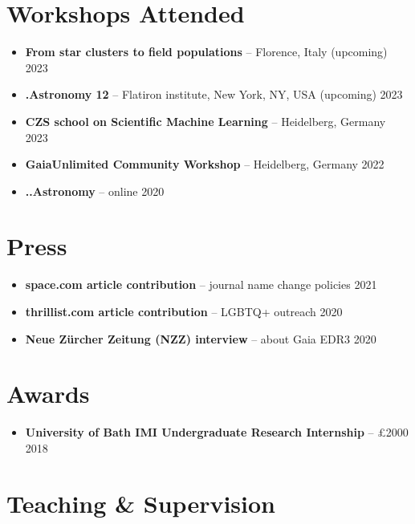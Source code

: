 \documentclass[12pt, letterpaper]{hunt-cv}
\begin{document}
\section*{Workshops Attended}

\begin{itemize}
    \item \textbf{From star clusters to field populations} -- Florence, Italy \hfill (upcoming) 2023
    \item \textbf{.Astronomy 12} -- Flatiron institute, New York, NY, USA \hfill (upcoming) 2023
    \item \textbf{CZS school on Scientific Machine Learning} -- Heidelberg, Germany \hfill 2023
    \item \textbf{GaiaUnlimited Community Workshop} -- Heidelberg, Germany \hfill 2022
    \item \textbf{..Astronomy} -- online \hfill 2020
\end{itemize}


\section*{Press}

\begin{itemize}
    \item \textbf{space.com article contribution} -- journal name change policies \hfill 2021
    \item \textbf{thrillist.com article contribution} -- LGBTQ+ outreach \hfill 2020
    \item \textbf{Neue Zürcher Zeitung (NZZ) interview} -- about Gaia EDR3 \hfill 2020
\end{itemize}


\section*{Awards}

\begin{itemize}
    \item \textbf{University of Bath IMI Undergraduate Research Internship} -- £2000 \hfill 2018\\
\end{itemize}


\section*{Teaching \& Supervision}
\end{document}
